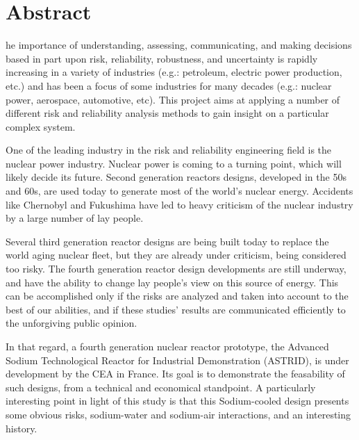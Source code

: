 %
%
%

\chapter*{Abstract}
\begin{SingleSpace}
he importance of understanding, assessing, communicating, and making decisions based in part upon risk, reliability, robustness, and uncertainty is rapidly increasing in a variety of industries (e.g.: petroleum, electric power production, etc.) and has been a focus of some industries for many decades (e.g.: nuclear power, aerospace, automotive, etc). This project aims at applying a number of different risk and reliability analysis methods to gain insight on a particular complex system.

One of the leading industry in the risk and reliability engineering field is the nuclear power industry. Nuclear power is coming to a turning point, which will likely decide its future. Second generation reactors designs, developed in the 50s and 60s, are used today to generate most of the world's nuclear energy. Accidents like Chernobyl and Fukushima have led to heavy criticism of the nuclear industry by a large number of lay people.

Several third generation reactor designs are being built today to replace the world aging nuclear fleet, but they are already under criticism, being considered too risky. The fourth generation reactor design developments are still underway, and have the ability to change lay people's view on this source of energy. This can be accomplished only if the risks are analyzed and taken into account to the best of our abilities, and if these studies' results are communicated efficiently to the unforgiving public opinion.

In that regard, a fourth generation nuclear reactor prototype, the Advanced Sodium Technological Reactor for Industrial Demonstration (ASTRID), is under development by the CEA in France. Its goal is to demonstrate the feasability of such designs, from a technical and economical standpoint. A particularly interesting point in light of this study is that this Sodium-cooled design presents some obvious risks, sodium-water and sodium-air interactions, and an interesting history.
\end{SingleSpace}
\clearpage

